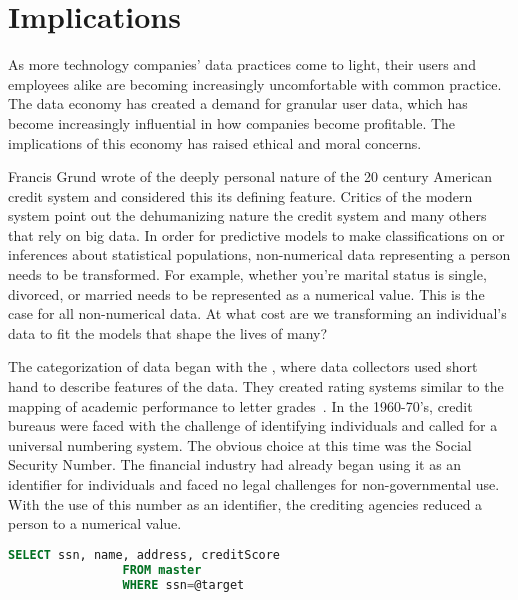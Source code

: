 \section{Implications}

As more technology companies' data practices come to light, their users and
employees alike are becoming increasingly uncomfortable with common practice.
The data economy has created a demand for granular user data, which has become
increasingly influential in how companies become profitable. The implications
of this economy has raised ethical and moral concerns.


Francis Grund wrote of the deeply personal nature of the 20 century
American credit system and considered this its defining feature. Critics of the
modern system point out the dehumanizing nature the credit system and many
others that rely on big data. In order for predictive models to make
classifications on or inferences about statistical populations, non-numerical
data representing a person needs to be transformed. For example, whether you're marital status is
single, divorced, or married needs to be represented as a numerical value. This
is the case for all non-numerical data. At what cost are we transforming an individual's data to fit the
models that shape the lives of many?

The categorization of data began with the \mca, where data collectors used
short hand to describe features of the data. They created rating systems
similar to the mapping of academic performance to letter
grades~\cite{lauer2017creditworthy}. In the 1960-70's, credit bureaus were faced
with the challenge of identifying individuals and called for a universal
numbering system. The obvious choice at this time was the Social Security
Number. The financial industry had already began using it as an identifier for
individuals and faced no legal challenges for non-governmental use. With the
use of this number as an identifier, the crediting agencies reduced a person to
a numerical value.

\begin{lstlisting}[language=SQL, basicstyle=\sffamily]
		SELECT ssn, name, address, creditScore
				FROM master
				WHERE ssn=@target
\end{lstlisting}

